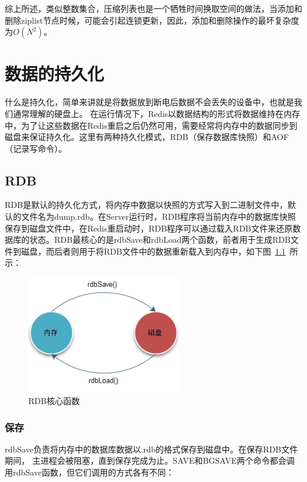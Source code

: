 \documentclass{zjutthesis}
\begin{document}
综上所述，类似整数集合，压缩列表也是一个牺牲时间换取空间的做法，当添加和删除ziplist节点时候，可能会引起连锁更新，因此，添加和删除操作的最坏复杂度为$O(N^{2})$。


\chapter{数据的持久化}
什么是持久化，简单来讲就是将数据放到断电后数据不会丢失的设备中，也就是我们通常理解的硬盘上。
在运行情况下，Redis以数据结构的形式将数据维持在内存中，为了让这些数据在Redis重启之后仍然可用，需要经常将内存中的数据同步到磁盘来保证持久化。这里有两种持久化模式，RDB（保存数据库快照）和AOF（记录写命令）。

\section{RDB}
RDB是默认的持久化方式，将内存中数据以快照的方式写入到二进制文件中，默认的文件名为dump.rdb。在Server运行时，RDB程序将当前内存中的数据库快照保存到磁盘文件中，在Redis重启动时，RDB程序可以通过载入RDB文件来还原数据库的状态。RDB最核心的是rdbSave和rdbLoad两个函数，前者用于生成RDB文件到磁盘，而后者则用于将RDB文件中的数据重新载入到内存中，如下图~\ref{fig:RDB}~所示：
\begin{figure}[H]
\centering
\includegraphics[width=0.6\textwidth]{RDB}
\caption{RDB核心函数}\label{fig:RDB}
\vspace{\baselineskip} %
\end{figure}

\subsection{保存}
rdbSave负责将内存中的数据库数据以.rdb的格式保存到磁盘中。在保存RDB文件期间，
主进程会被阻塞，直到保存完成为止。SAVE和BGSAVE两个命令都会调用rdbSave函数，但它们调用的方式各有不同：
\end{document}
